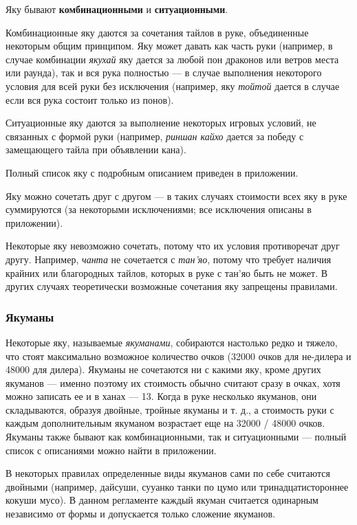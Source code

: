 Яку бывают \textbf{комбинационными} и \textbf{ситуационными}. 

Комбинационные яку даются за сочетания тайлов в руке, объединенные некоторым общим принципом. Яку может давать как часть руки (например, в случае комбинации \textit{якухай} яку дается за любой пон драконов или ветров места или раунда), так и вся рука полностью --- в случае выполнения некоторого условия для всей руки без исключения (например, яку \textit{тойтой} дается в случае если вся рука состоит только из понов). 

Ситуационные яку даются за выполнение некоторых игровых условий, не связанных с формой руки (например, \textit{риншан кайхо} дается за победу с замещающего тайла при объявлении кана).

Полный список яку с подробным описанием приведен в приложении.

Яку можно сочетать друг с другом --- в таких случаях стоимости всех яку в руке суммируются (за некоторыми исключениями; все исключения описаны в приложении).

Некоторые яку невозможно сочетать, потому что их условия противоречат друг другу. Например, \textit{чанта} не сочетается с \textit{тан'яо}, потому что требует наличия крайних или благородных тайлов, которых в руке с тан'яо быть не может. В других случаях теоретически возможные сочетания яку запрещены правилами.

\subsubsection{Якуманы}

Некоторые яку, называемые \textit{якуманами}, собираются настолько редко и тяжело, что стоят максимально возможное количество очков (32000 очков для не-дилера и 48000 для дилера). Якуманы не сочетаются ни с какими яку, кроме других якуманов --- именно поэтому их стоимость обычно считают сразу в очках, хотя можно записать ее и в ханах --- 13. Когда в руке несколько якуманов, они складываются, образуя двойные, тройные якуманы и т. д., а стоимость руки с каждым дополнительным якуманом возрастает еще на 32000 / 48000 очков. Якуманы также бывают как комбинационными, так и ситуационными --- полный список с описаниями можно найти в приложении.

В некоторых правилах определенные виды якуманов сами по себе считаются двойными (например, дайсуши, сууанко танки по цумо или тринадцатистороннее кокуши мусо). В данном регламенте каждый якуман считается одинарным независимо от формы и допускается только сложение якуманов.

